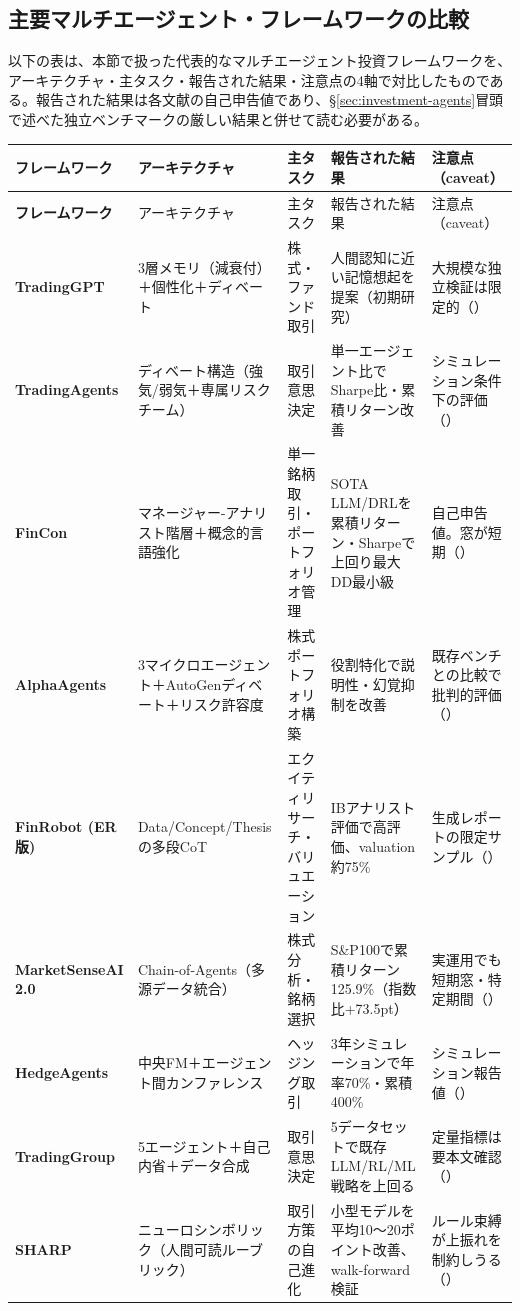 \subsection{主要マルチエージェント・フレームワークの比較}

以下の表は、本節で扱った代表的なマルチエージェント投資フレームワークを、アーキテクチャ・主タスク・報告された結果・注意点の4軸で対比したものである。報告された結果は各文献の自己申告値であり、\S\ref{sec:investment-agents}冒頭で述べた独立ベンチマークの厳しい結果と併せて読む必要がある。

\begingroup
\footnotesize
\setlength{\tabcolsep}{4pt}
\begin{longtable}{@{}>{\bfseries}p{2.0cm}p{2.9cm}p{1.7cm}p{4.3cm}p{3.5cm}@{}}
\toprule
フレームワーク & アーキテクチャ & 主タスク & 報告された結果 & 注意点（caveat）\\
\midrule
\endfirsthead
\toprule
フレームワーク & アーキテクチャ & 主タスク & 報告された結果 & 注意点（caveat）\\
\midrule
\endhead
TradingGPT & 3層メモリ（減衰付）＋個性化＋ディベート & 株式・ファンド取引 & 人間認知に近い記憶想起を提案（初期研究） & 大規模な独立検証は限定的（\cite{x04tradinggpt2023}）\\
\addlinespace
TradingAgents & ディベート構造（強気/弱気＋専属リスクチーム） & 取引意思決定 & 単一エージェント比でSharpe比・累積リターン改善 & シミュレーション条件下の評価（\cite{tradingagents2024}）\\
\addlinespace
FinCon & マネージャー-アナリスト階層＋概念的言語強化 & 単一銘柄取引・ポートフォリオ管理 & SOTA LLM/DRLを累積リターン・Sharpeで上回り最大DD最小級 & 自己申告値。窓が短期（\cite{x04fincon2024}）\\
\addlinespace
AlphaAgents & 3マイクロエージェント＋AutoGenディベート＋リスク許容度 & 株式ポートフォリオ構築 & 役割特化で説明性・幻覚抑制を改善 & 既存ベンチとの比較で批判的評価（\cite{alphaagents2025}）\\
\addlinespace
FinRobot (ER版) & Data/Concept/Thesis の多段CoT & エクイティリサーチ・バリュエーション & IBアナリスト評価で高評価、valuation約75\% & 生成レポートの限定サンプル（\cite{x04finrobotequity2024}）\\
\addlinespace
MarketSenseAI 2.0 & Chain-of-Agents（多源データ統合） & 株式分析・銘柄選択 & S\&P100で累積リターン125.9\%（指数比+73.5pt） & 実運用でも短期窓・特定期間（\cite{marketsenseai2025}）\\
\addlinespace
HedgeAgents & 中央FM＋エージェント間カンファレンス & ヘッジング取引 & 3年シミュレーションで年率70\%・累積400\% & シミュレーション報告値（\cite{hedgeagents2025}）\\
\addlinespace
TradingGroup & 5エージェント＋自己内省＋データ合成 & 取引意思決定 & 5データセットで既存LLM/RL/ML戦略を上回る & 定量指標は要本文確認（\cite{x04tradinggroup2025}）\\
\addlinespace
SHARP & ニューロシンボリック（人間可読ルーブリック） & 取引方策の自己進化 & 小型モデルを平均10〜20ポイント改善、walk-forward検証 & ルール束縛が上振れを制約しうる（\cite{x04sharp2026}）\\
\bottomrule
\end{longtable}
\endgroup

